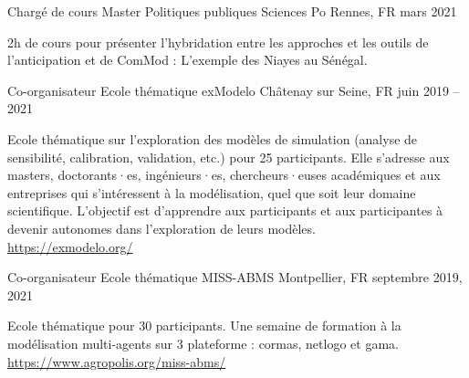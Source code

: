 

\begin{cventries}
  \cventry
    {Chargé de cours} %
    {Master Politiques publiques} %
    {Sciences Po Rennes, FR} %
    {mars 2021} %
    {
      \begin{cvitems} %
      2h de cours pour présenter l'hybridation entre les approches et les outils de l'anticipation et de ComMod : L'exemple des Niayes au Sénégal.
      \end{cvitems}
    }
    \cventry
      {Co-organisateur} %
      {Ecole thématique exModelo} %
      {Châtenay sur Seine, FR} %
      {juin 2019 -- 2021} %
      {
        \begin{cvitems} %
          Ecole thématique sur l’exploration des modèles de simulation (analyse de sensibilité, calibration, validation, etc.) pour 25 participants. Elle s’adresse aux masters, doctorants·es, ingénieurs·es, chercheurs·euses académiques et aux entreprises qui s’intéressent à la modélisation, quel que soit leur domaine scientifique. L’objectif est d’apprendre aux participants et aux participantes à devenir autonomes dans l’exploration de leurs modèles.\\
          \url{https://exmodelo.org/}
          \end{cvitems}
      }
    \cventry
      {Co-organisateur} %
      {Ecole thématique MISS-ABMS} %
      {Montpellier, FR} %
      {septembre 2019, 2021} %
      {
      \begin{cvitems} %
        Ecole thématique pour 30 participants. Une semaine de formation à la modélisation multi-agents sur 3 plateforme : cormas, netlogo et gama.\\
        \url{https://www.agropolis.org/miss-abms/}

\end{cvitems}}
\end{cventries}
